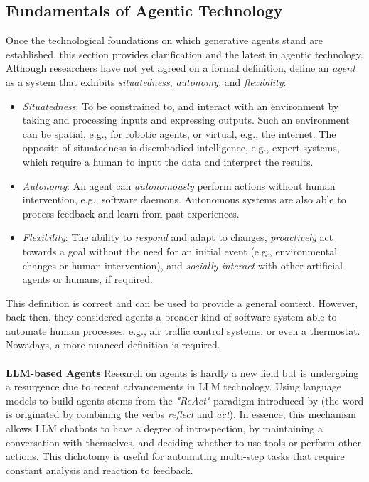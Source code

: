 \subsection{Fundamentals of Agentic Technology}
Once the technological foundations on which generative agents stand are established, this section provides clarification and the latest in agentic technology. Although researchers have not yet agreed on a formal definition, \textcite[pp. 8-9]{jennings_roadmap_1998} define an \textit{agent} as a system that exhibits \textit{situatedness}, \textit{autonomy}, and \textit{flexibility}:
\begin{itemize}
    \item \textit{Situatedness}: To be constrained to, and interact with an environment by taking and processing inputs and expressing outputs. Such an environment can be spatial, e.g., for robotic agents, or virtual, e.g., the internet. The opposite of situatedness is disembodied intelligence, e.g., expert systems, which require a human to input the data and interpret the results.
    \item \textit{Autonomy}: An agent can \textit{autonomously} perform actions without human intervention, e.g., software daemons. Autonomous systems are also able to process feedback and learn from past experiences.
    \item \textit{Flexibility}: The ability to \textit{respond} and adapt to changes, \textit{proactively} act towards a goal without the need for an initial event (e.g., environmental changes or human intervention), and \textit{socially interact} with other artificial agents or humans, if required.
    \end{itemize}
This definition is correct and can be used to provide a general context. However, back then, they considered agents a broader kind of software system able to automate human processes, e.g., air traffic control systems, or even a thermostat. Nowadays, a more nuanced definition is required. \\\\
\textbf{LLM-based Agents} \indent Research on agents is hardly a new field but is undergoing a resurgence due to recent advancements in LLM technology. Using language models to build agents stems from the \textit{"ReAct"} paradigm introduced by \textcite{Yao.06.10.2022} (the word is originated by combining the verbs \textit{reflect} and \textit{act}). In essence, this mechanism allows LLM chatbots to have a degree of introspection, by maintaining a conversation with themselves,  and deciding whether to use tools or perform other actions. This dichotomy is useful for automating multi-step tasks that require constant analysis and reaction to feedback.\\
